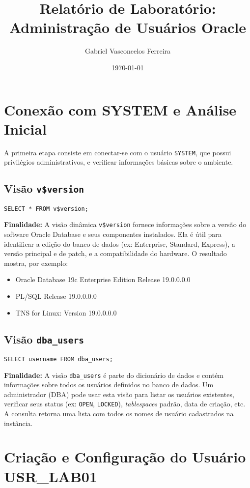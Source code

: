 \documentclass[a4paper, 12pt]{article}
\title{Relatório de Laboratório: Administração de Usuários Oracle}
\author{Gabriel Vasconcelos Ferreira}
\date{\today}
\begin{document}
\maketitle
\newpage
\section{Conexão com SYSTEM e Análise Inicial}
A primeira etapa consiste em conectar-se com o usuário \texttt{SYSTEM}, que possui privilégios administrativos, e verificar informações básicas sobre o ambiente.

\subsection{Visão \texttt{v\$version}}
\begin{lstlisting}
SELECT * FROM v$version;
\end{lstlisting}
\textbf{Finalidade:} A visão dinâmica \texttt{v\$version} fornece informações sobre a versão do software Oracle Database e seus componentes instalados. Ela é útil para identificar a edição do banco de dados (ex: Enterprise, Standard, Express), a versão principal e de patch, e a compatibilidade do hardware. O resultado mostra, por exemplo:
\begin{itemize}
	\item Oracle Database 19c Enterprise Edition Release 19.0.0.0.0
	\item PL/SQL Release 19.0.0.0.0
	\item TNS for Linux: Version 19.0.0.0.0
\end{itemize}

\subsection{Visão \texttt{dba\_users}}
\begin{lstlisting}
SELECT username FROM dba_users;
\end{lstlisting}
\textbf{Finalidade:} A visão \texttt{dba\_users} é parte do dicionário de dados e contém informações sobre todos os usuários definidos no banco de dados. Um administrador (DBA) pode usar esta visão para listar os usuários existentes, verificar seus status (ex: \texttt{OPEN}, \texttt{LOCKED}), \textit{tablespaces} padrão, data de criação, etc. A consulta retorna uma lista com todos os nomes de usuário cadastrados na instância.

\section{Criação e Configuração do Usuário USR\_LAB01}
\end{document}
